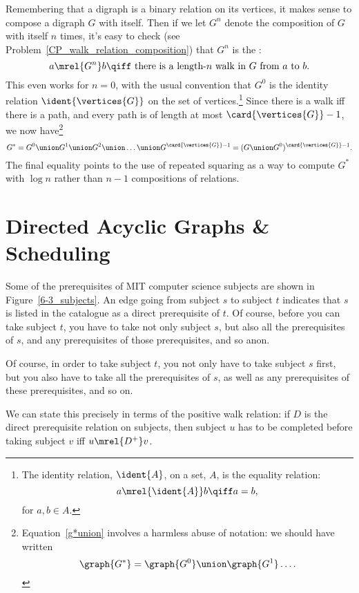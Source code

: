 Remembering that a digraph is a binary relation on its vertices, it
makes sense to compose a digraph $G$ with itself.  Then if we let
$G^n$ denote the composition of $G$ with itself $n$ times, it's easy
to check (see Problem~\ref{CP_walk_relation_composition}) that $G^n$
is the :
\[
a  \mrel{G^n} b \qiff \mbox{ there is a length-$n$ walk in $G$ from $a$ to $b$}.
\]
This even works for $n=0$, with the usual convention that $G^0$ is the
identity relation $\ident{\vertices{G}}$ on the set of
vertices.\footnote{The identity relation, $\ident{A}$, on a set, $A$,
  is the equality relation:
\[
a \mrel{\ident{A}} b \qiff a  = b,
\]
for $a,b \in A$.}  Since there is a walk iff there is a path,
and every path is of length at most $\card{\vertices{G}}-1$, 
we now have\footnote{Equation~\eqref{g*union} involves a harmless
  abuse of notation: we should have written
\[
\graph{G^*} = \graph{G^0} \union \graph{G^1} \dots.
\]
}
\begin{equation}\label{g*union}
G^* = G^0 \union G^1 \union G^2 \union \dots \union
G^{\card{\vertices{G}}-1} = (G \union G^0)^{\card{\vertices{G}}-1}.
\end{equation}
The final equality points to the use of repeated squaring as a way to
compute $G^*$ with $\log n$ rather than $n-1$ compositions of
relations.

\begin{problems}
\practiceproblems
{}

\homeworkproblems
{}
\end{problems}

\section{Directed Acyclic Graphs \& Scheduling}\label{dag_sec}

Some of the prerequisites of MIT computer science subjects are shown
in Figure~\ref{6-3_subjects}.  An edge going from subject $s$ to
subject $t$ indicates that $s$ is listed in the catalogue as a direct
prerequisite of $t$.  Of course, before you can take subject $t$, you
have to take not only subject $s$, but also all the prerequisites of $s$,
and any prerequisites of those prerequisites, and so
anon.
\begin{editingnotes} Of course, in order to take subject $t$, you
  not only have to take subject $s$ first, but you also have to take
  all the prerequisites of $s$, as well as any prerequisites of these
  prerequisites, and so on.
\end{editingnotes}
We can state this precisely in terms of the positive walk relation: if
$D$ is the direct prerequisite relation on subjects, then subject $u$
has to be completed before taking subject $v$ iff $u \mrel{D^+} v$.

